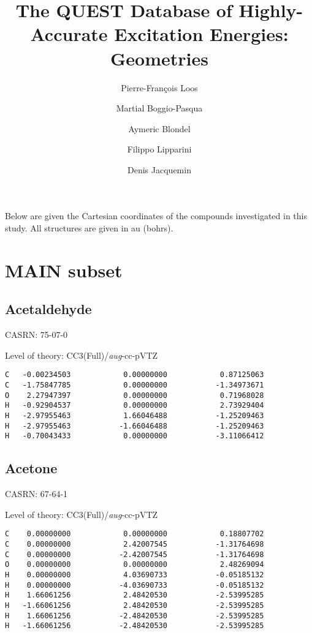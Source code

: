 \documentclass[journal=jctcce,manuscript=article,layout=traditional]{achemso}
\author{Pierre-Fran{\c c}ois Loos}
\affiliation[LCPQ, Toulouse]{\LCPQ}
\author{Martial Boggio-Pasqua}
\affiliation[LCPQ, Toulouse]{\LCPQ}
\author{Aymeric Blondel}
\affiliation[UN, Nantes]{\CEISAM}
\author{Filippo Lipparini}
\affiliation[UP, Pisa]{\UOP}
\author{Denis Jacquemin}
\affiliation[UN, Nantes]{\CEISAM}
\title{The QUEST Database of Highly-Accurate Excitation Energies:\\ Geometries}
\newcommand{\AVTZ}{\emph{aug}-cc-pVTZ}
\begin{document}
\clearpage

Below are given the Cartesian coordinates of the compounds investigated in this study. All structures are given in au (bohrs).

\clearpage

\section{MAIN subset}

\subsection{Acetaldehyde}

CASRN: 75-07-0

\begin{singlespace}
\noindent Level of theory: CC3(Full)/{\AVTZ}
\begin{verbatim}
C   -0.00234503            0.00000000            0.87125063
C   -1.75847785            0.00000000           -1.34973671
O    2.27947397            0.00000000            0.71968028
H   -0.92904537            0.00000000            2.73929404
H   -2.97955463            1.66046488           -1.25209463
H   -2.97955463           -1.66046488           -1.25209463
H   -0.70043433            0.00000000           -3.11066412
\end{verbatim}
\end{singlespace}

\subsection{Acetone}

CASRN: 67-64-1

\begin{singlespace}
\noindent Level of theory: CC3(Full)/{\AVTZ}
\begin{verbatim}
C    0.00000000            0.00000000            0.18807702
C    0.00000000            2.42007545           -1.31764698
C    0.00000000           -2.42007545           -1.31764698
O    0.00000000            0.00000000            2.48269094
H    0.00000000            4.03690733           -0.05185132
H    0.00000000           -4.03690733           -0.05185132
H    1.66061256            2.48420530           -2.53995285
H   -1.66061256            2.48420530           -2.53995285 
H    1.66061256           -2.48420530           -2.53995285
H   -1.66061256           -2.48420530           -2.53995285   
\end{verbatim}
\end{singlespace}
\end{document}

